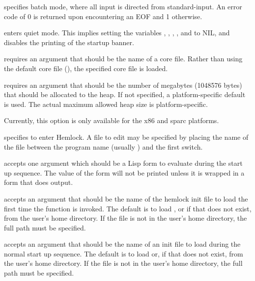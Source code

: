 \begin{Lentry}
\item[\code{-batch}] specifies batch mode, where all input is
  directed from standard-input.  An error code of 0 is returned upon
  encountering an EOF and 1 otherwise.

\item[\code{-quiet}] enters quiet mode. This implies setting the
  variables , ,
  , ,
   and  to NIL, and
  disables the printing of the startup banner.

\item[\code{-core}] requires an argument that should be the name of a
  core file.  Rather than using the default core file
  (), the specified core file is loaded.
  
\item[\code{-dynamic-space-size}] requires an argument that should be
  the number of megabytes (1048576 bytes) that should be allocated to
  the heap.  If not specified, a platform-specific default is used.
  The actual maximum allowed heap size is platform-specific.

  Currently, this option is only available for the x86 and sparc
  platforms. 

\item[\code{-edit}] specifies to enter Hemlock.  A file to edit may be
  specified by placing the name of the file between the program name
  (usually ) and the first switch.
  
\item[\code{-eval}] accepts one argument which should be a Lisp form
  to evaluate during the start up sequence.  The value of the form
  will not be printed unless it is wrapped in a form that does output.
  
\item[\code{-hinit}] accepts an argument that should be the name of
  the hemlock init file to load the first time the function
   is invoked.  The default is to load
  , or if that does not exist,
   from the user's home directory.  If the
  file is not in the user's home directory, the full path must be
  specified.
  
\item[\code{-init}] accepts an argument that should be the name of an
  init file to load during the normal start up sequence.  The default
  is to load  or, if that does not exist,
   from the user's home directory.  If the file is not
  in the user's home directory, the full path must be specified.
  

\end{Lentry}
